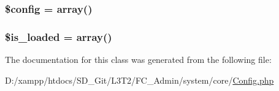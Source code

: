 \subsubsection[{\$config}]{\setlength{\rightskip}{0pt plus 5cm}\$config = array()}\label{class_c_i___config_a49c7011be9c979d9174c52a8b83e5d8e}
\hypertarget{class_c_i___config_a908e9ad52a5d1956d360689452f6bdbe}{}
\subsubsection[{\$is\+\_\+loaded}]{\setlength{\rightskip}{0pt plus 5cm}\$is\+\_\+loaded = array()}\label{class_c_i___config_a908e9ad52a5d1956d360689452f6bdbe}


The documentation for this class was generated from the following file\+:\begin{DoxyCompactItemize}
\item 
D\+:/xampp/htdocs/\+S\+D\+\_\+\+Git/\+L3\+T2/\+F\+C\+\_\+\+Admin/system/core/\hyperlink{system_2core_2config_8php}{Config.\+php}\end{DoxyCompactItemize}
